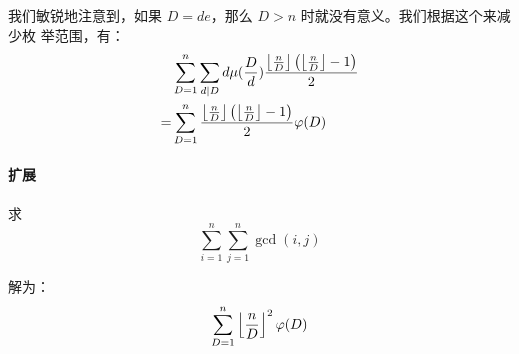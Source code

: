我们敏锐地注意到，如果 $D = de$，那么 $D > n$ 时就没有意义。我们根据这个来减少枚
举范围，有：\begin{align*}
    & \sum_{D=1}^{n} \sum_{d \mid D} d \mu({D \over d}) {\left\lfloor {n \over
        D} \right\rfloor\left( {\left\lfloor {n \over D} \right\rfloor - 1} \right) \over 2} \\
    = & \sum_{D=1}^{n} {\left\lfloor {n \over D} \right\rfloor \left( {\left\lfloor {n \over D} \right\rfloor - 1} \right) \over
        2} \varphi(D) 
\end{align*}

\paragraph{扩展} 求 \[
    \sum_{i=1}^n \sum_{j=1}^n \gcd(i, j)
\]

解为：\[
    \sum_{D=1}^{n} \left\lfloor {n \over D} \right\rfloor^2 \varphi(D) 
\]

